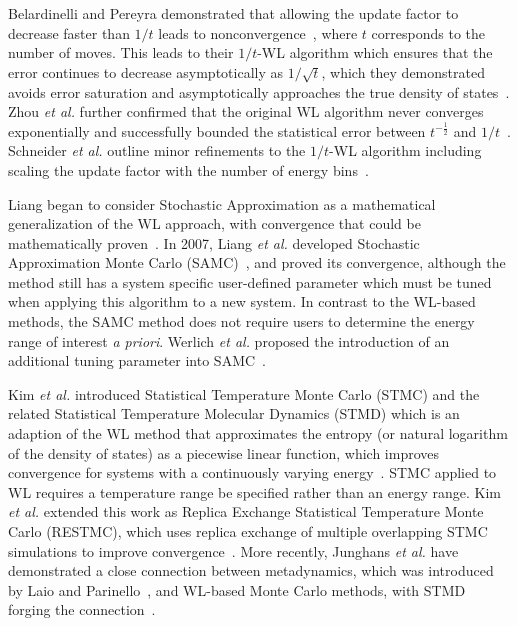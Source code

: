 \documentclass[letterpaper,twocolumn,amsmath,amssymb,pre,aps,10pt]{revtex4-1}
\begin{document}
Belardinelli and Pereyra demonstrated that allowing the update factor to
decrease faster than $1/t$ leads to nonconvergence~\cite{belardinelli2007wang},
where $t$ corresponds to the number of moves.
This leads to their $1/t$-WL algorithm which ensures that the error continues to
decrease asymptotically as $1/\sqrt{t}$, which they demonstrated avoids
error saturation and asymptotically approaches the true density of
states~\cite{belardinelli2008analysis}. Zhou \emph{et al.} further confirmed that the
original WL algorithm never converges exponentially and successfully bounded the
statistical error between $t^{-\frac12}$ and $1/t$~\cite{zhou2008optimal}.
Schneider \emph{et al.} outline minor refinements to the $1/t$-WL algorithm
including scaling the update factor with the number of energy
bins~\cite{schneider2017convergence}.


Liang began to consider Stochastic Approximation as a mathematical
generalization of the WL approach, with convergence that could be mathematically
proven~\cite{liang2006theory}. In 2007, Liang \emph{et al.}
developed Stochastic Approximation Monte Carlo (SAMC)~\cite{liang2007stochastic,
liang2009improving}, and proved its convergence, although the method still has a
system specific user-defined parameter which must be tuned when applying this
algorithm to a new system.  In contrast to the WL-based methods, the SAMC method
does not require users to determine the energy range of interest \emph{a
priori}. Werlich \emph{et al.} proposed the introduction of an additional tuning
parameter into SAMC~\cite{werlich2015stochastic}.

Kim \emph{et al.} introduced Statistical Temperature Monte Carlo (STMC) and the
related Statistical Temperature Molecular Dynamics (STMD) which is an
adaption of the WL method that approximates the entropy (or natural logarithm of the density of
states) as a piecewise linear function, which improves convergence for systems
with a continuously varying energy~\cite{kim2006statistical,
kim2007statistical}. STMC applied to WL requires a temperature range be
specified rather than an energy range.  Kim \emph{et al.} extended this work as
Replica Exchange Statistical Temperature Monte Carlo (RESTMC), which uses
replica exchange of multiple overlapping STMC simulations to improve
convergence~\cite{kim2009replica}. More recently, Junghans \emph{et al.} have
demonstrated a close connection between metadynamics, which was introduced by
Laio and Parinello~\cite{laio2002escaping}, and WL-based Monte Carlo methods,
with STMD forging the connection~\cite{junghans2014molecular}.
\end{document}
